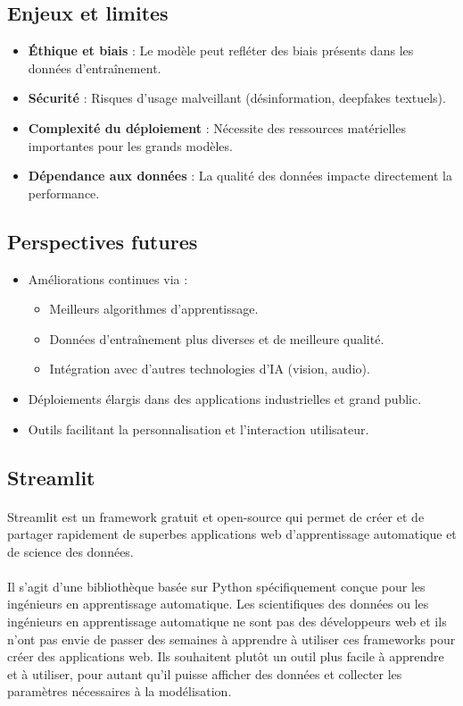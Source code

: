 \subsection{Enjeux et limites}
\begin{itemize}
    \item \textbf{Éthique et biais} : Le modèle peut refléter des biais présents dans les données d’entraînement.
    \item \textbf{Sécurité} : Risques d’usage malveillant (désinformation, deepfakes textuels).
    \item \textbf{Complexité du déploiement} : Nécessite des ressources matérielles importantes pour les grands modèles.
    \item \textbf{Dépendance aux données} : La qualité des données impacte directement la performance.
\end{itemize}

\subsection{Perspectives futures}
\begin{itemize}
    \item Améliorations continues via :
    \begin{itemize}
        \item Meilleurs algorithmes d’apprentissage.
        \item Données d’entraînement plus diverses et de meilleure qualité.
        \item Intégration avec d’autres technologies d’IA (vision, audio).
    \end{itemize}
    \item Déploiements élargis dans des applications industrielles et grand public.
    \item Outils facilitant la personnalisation et l’interaction utilisateur.
\end{itemize}

\subsection{Streamlit}
\paragraph{}
Streamlit est un framework gratuit et open-source qui permet de créer et de partager rapidement de superbes applications web d'apprentissage automatique et de science des données.
\paragraph{}
Il s'agit d'une bibliothèque basée sur Python spécifiquement conçue pour les ingénieurs en apprentissage automatique. Les scientifiques des données ou les ingénieurs en apprentissage automatique ne sont pas des développeurs web et ils n'ont pas envie de passer des semaines à apprendre à utiliser ces frameworks pour créer des applications web. Ils souhaitent plutôt un outil plus facile à apprendre et à utiliser, pour autant qu'il puisse afficher des données et collecter les paramètres nécessaires à la modélisation.
